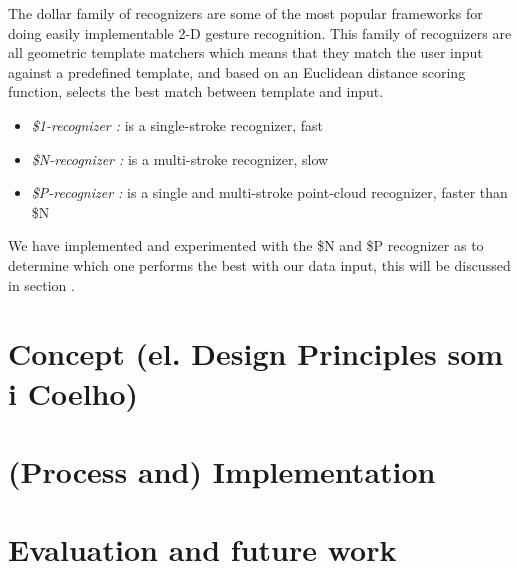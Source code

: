 
The dollar family of recognizers \citep{anthony2010lightweight,vatavu2012gestures,wobbrock2007gestures} are some of the most popular frameworks for doing easily implementable 2-D gesture recognition.
This family of recognizers are all geometric template matchers which means that they match the user input against a predefined template, and based on an Euclidean distance scoring function, selects the best match between template and input.
\begin{itemize}
  \item \emph{\$1-recognizer \citep{wobbrock2007gestures}:} is a single-stroke recognizer, fast
  \item \emph{\$N-recognizer \citep{anthony2010lightweight}:} is a multi-stroke recognizer, slow
  \item \emph{\$P-recognizer \citep{vatavu2012gestures}:} is a single and multi-stroke point-cloud recognizer, faster than \$N
\end{itemize}
We have implemented and experimented with the \$N and \$P recognizer as to determine which one performs the best with our data input, this will be discussed in section .


\section{Concept (el. Design Principles som i Coelho)}


\section{(Process and) Implementation}


\section{Evaluation and future work}
